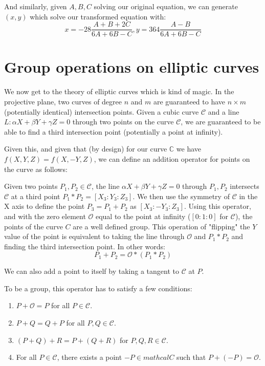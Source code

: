 \documentclass{article}
\begin{document}
And similarly, given $A, B, C$ solving our original equation, we  can generate $(x,y)$ which solve our transformed
equation with:
\[ x = -28\frac{A + B + 2C}{6A + 6B - C}, y = 364\frac{A - B}{6A + 6B - C} \]

\section{Group operations on elliptic curves}

We now get to the theory of elliptic curves which is kind of magic. In the projective plane, two curves of 
degree $n$ and $m$ are guaranteed to have $n\times m$ (potentially identical) intersection points. Given a
cubic curve $\mathcal{C}$ and a line $L: \alpha X + \beta Y + \gamma Z = 0$ through two points on the curve
$\mathcal{C}$, we are guaranteed to be able to find a third intersection point (potentially a point at
infinity).

Given this, and given that (by design) for our curve $\mathbb{C}$ we have $f(X,Y,Z) = f(X,-Y,Z)$, we can
define an addition operator for points on the curve as follows:

Given two points $P_1, P_2 \in \mathcal{C}$, the line $\alpha X + \beta Y + \gamma Z = 0$ through $P_1, P_2$
intersects $\mathcal{C}$ at a third point $P_1*P_2 = [X_3:Y_3:Z_3]$. We then use the symmetry of $\mathcal{C}$
in the X axis to define the point $P_3 = P_1 + P_2$ as $[X_3:-Y_3:Z_3]$. Using this operator, and with the zero
element $\mathcal{O}$ equal to the point at infinity ($[0:1:0]$ for $\mathcal{C}$), the points of the curve $C$
are a well defined group. This operation of "flipping" the $Y$ value of the point is equivalent to taking the
line through $\mathcal{O}$ and $P_1*P_2$ and finding the third intersection point. In other words:
\[ P_1 + P_2 = \mathcal{O}*(P_1*P_2) \]

We can also add a point to itself by taking a tangent to $\mathcal{C}$ at $P$.

To be a group, this operator has to satisfy a few conditions:
\begin{enumerate}
	\item $P + \mathcal{O} = P$ for all $P \in \mathcal{C}$.
	\item $P + Q = Q + P$ for all $P, Q \in \mathcal{C}$.
	\item $(P + Q) + R = P + (Q + R)$ for $P,Q,R \in \mathcal{C}$.
	\item For all $P \in \mathcal{C}$, there exists a point $-P \in mathcal{C}$ such that $P+(-P) = \mathcal{O}$.
\end{enumerate}
\end{document}
